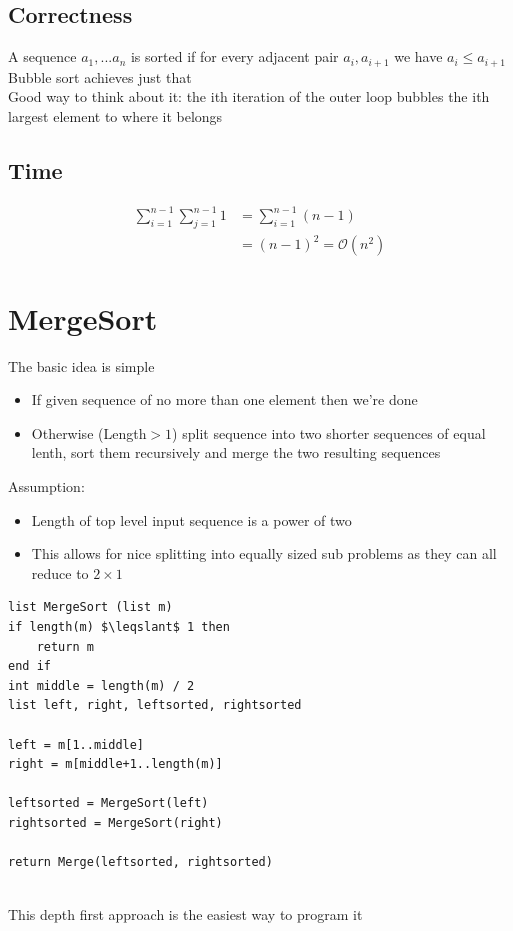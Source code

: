 \documentclass{article}[18pt]
\begin{document}
\subsection{Correctness}
A sequence $a_1,...a_n$ is sorted if for every adjacent pair $a_i,a_{i+1}$ we have $a_i\leqslant a_{i+1}$\\
Bubble sort achieves just that\\
Good way to think about it: the ith iteration of the outer loop bubbles the ith largest element to where it belongs
\subsection{Time}
$$\begin{aligned}  { \sum _ { i = 1 } ^ { n - 1 } \sum _ { j = 1 } ^ { n - 1 } 1 } & { = \sum _ { i = 1 } ^ { n - 1 } ( n - 1 ) } \\ { } & { = ( n - 1 ) ^ { 2 } = \mathcal{O} \left( n ^ { 2 } \right) } \end{aligned}$$
\section{MergeSort}
The basic idea is simple
\begin{itemize}
	\item If given sequence of no more than one element then we're done
	\item Otherwise (Length$>1$) split sequence into two shorter sequences of equal lenth, sort them recursively and merge the two resulting sequences
\end{itemize}
Assumption:
\begin{itemize}
	\item Length of top level input sequence is a power of two
	\item This allows for nice splitting into equally sized sub problems as they can all reduce to $2\times 1$
\end{itemize}
\begin{lstlisting}
list MergeSort (list m)
if length(m) $\leqslant$ 1 then
	return m
end if
int middle = length(m) / 2
list left, right, leftsorted, rightsorted

left = m[1..middle]
right = m[middle+1..length(m)]

leftsorted = MergeSort(left)
rightsorted = MergeSort(right)

return Merge(leftsorted, rightsorted)


\end{lstlisting}
This depth first approach is the easiest way to program it
\end{document}
